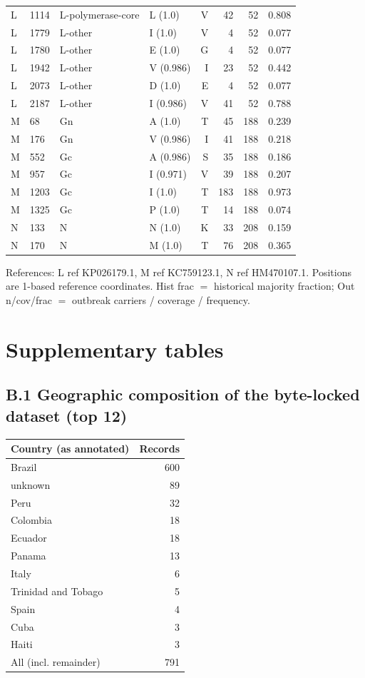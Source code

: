 \documentclass[12pt]{article}
\begin{document}
\begin{longtable}{llllrrrl}
L & 1114 & L-polymerase-core & L (1.0) & V & 42 & 52 & 0.808 \\
L & 1779 & L-other & I (1.0) & V & 4 & 52 & 0.077 \\
L & 1780 & L-other & E (1.0) & G & 4 & 52 & 0.077 \\
L & 1942 & L-other & V (0.986) & I & 23 & 52 & 0.442 \\
L & 2073 & L-other & D (1.0) & E & 4 & 52 & 0.077 \\
L & 2187 & L-other & I (0.986) & V & 41 & 52 & 0.788 \\
M & 68 & Gn & A (1.0) & T & 45 & 188 & 0.239 \\
M & 176 & Gn & V (0.986) & I & 41 & 188 & 0.218 \\
M & 552 & Gc & A (0.986) & S & 35 & 188 & 0.186 \\
M & 957 & Gc & I (0.971) & V & 39 & 188 & 0.207 \\
M & 1203 & Gc & I (1.0) & T & 183 & 188 & 0.973 \\
M & 1325 & Gc & P (1.0) & T & 14 & 188 & 0.074 \\
N & 133 & N & N (1.0) & K & 33 & 208 & 0.159 \\
N & 170 & N & M (1.0) & T & 76 & 208 & 0.365 \\
\hline
\end{longtable}
\normalsize
References: L ref KP026179.1, M ref KC759123.1, N ref HM470107.1. Positions are 1-based reference coordinates. Hist frac $=$ historical majority fraction; Out n/cov/frac $=$ outbreak carriers / coverage / frequency.

\section{Supplementary tables}
\subsection*{B.1 Geographic composition of the byte-locked dataset (top 12)}
\begin{center}\begin{tabular}{lr}
\hline
Country (as annotated) & Records \\
\hline
Brazil & 600 \\
unknown & 89 \\
Peru & 32 \\
Colombia & 18 \\
Ecuador & 18 \\
Panama & 13 \\
Italy & 6 \\
Trinidad and Tobago & 5 \\
Spain & 4 \\
Cuba & 3 \\
Haiti & 3 \\
\hline
All (incl. remainder) & 791 \\
\hline
\end{tabular}\end{center}
\end{document}
